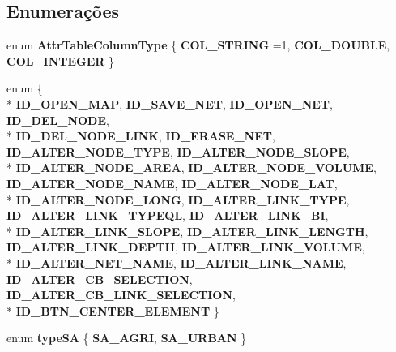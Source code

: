\subsection*{Enumerações}
\begin{DoxyCompactItemize}
\item 
enum {\bf Attr\+Table\+Column\+Type} \{ {\bf C\+O\+L\+\_\+\+S\+T\+R\+I\+NG} =1, 
{\bf C\+O\+L\+\_\+\+D\+O\+U\+B\+LE}, 
{\bf C\+O\+L\+\_\+\+I\+N\+T\+E\+G\+ER}
 \}
\item 
enum \{ \\*
{\bf I\+D\+\_\+\+O\+P\+E\+N\+\_\+\+M\+AP}, 
{\bf I\+D\+\_\+\+S\+A\+V\+E\+\_\+\+N\+ET}, 
{\bf I\+D\+\_\+\+O\+P\+E\+N\+\_\+\+N\+ET}, 
{\bf I\+D\+\_\+\+D\+E\+L\+\_\+\+N\+O\+DE}, 
\\*
{\bf I\+D\+\_\+\+D\+E\+L\+\_\+\+N\+O\+D\+E\+\_\+\+L\+I\+NK}, 
{\bf I\+D\+\_\+\+E\+R\+A\+S\+E\+\_\+\+N\+ET}, 
{\bf I\+D\+\_\+\+A\+L\+T\+E\+R\+\_\+\+N\+O\+D\+E\+\_\+\+T\+Y\+PE}, 
{\bf I\+D\+\_\+\+A\+L\+T\+E\+R\+\_\+\+N\+O\+D\+E\+\_\+\+S\+L\+O\+PE}, 
\\*
{\bf I\+D\+\_\+\+A\+L\+T\+E\+R\+\_\+\+N\+O\+D\+E\+\_\+\+A\+R\+EA}, 
{\bf I\+D\+\_\+\+A\+L\+T\+E\+R\+\_\+\+N\+O\+D\+E\+\_\+\+V\+O\+L\+U\+ME}, 
{\bf I\+D\+\_\+\+A\+L\+T\+E\+R\+\_\+\+N\+O\+D\+E\+\_\+\+N\+A\+ME}, 
{\bf I\+D\+\_\+\+A\+L\+T\+E\+R\+\_\+\+N\+O\+D\+E\+\_\+\+L\+AT}, 
\\*
{\bf I\+D\+\_\+\+A\+L\+T\+E\+R\+\_\+\+N\+O\+D\+E\+\_\+\+L\+O\+NG}, 
{\bf I\+D\+\_\+\+A\+L\+T\+E\+R\+\_\+\+L\+I\+N\+K\+\_\+\+T\+Y\+PE}, 
{\bf I\+D\+\_\+\+A\+L\+T\+E\+R\+\_\+\+L\+I\+N\+K\+\_\+\+T\+Y\+P\+E\+QL}, 
{\bf I\+D\+\_\+\+A\+L\+T\+E\+R\+\_\+\+L\+I\+N\+K\+\_\+\+BI}, 
\\*
{\bf I\+D\+\_\+\+A\+L\+T\+E\+R\+\_\+\+L\+I\+N\+K\+\_\+\+S\+L\+O\+PE}, 
{\bf I\+D\+\_\+\+A\+L\+T\+E\+R\+\_\+\+L\+I\+N\+K\+\_\+\+L\+E\+N\+G\+TH}, 
{\bf I\+D\+\_\+\+A\+L\+T\+E\+R\+\_\+\+L\+I\+N\+K\+\_\+\+D\+E\+P\+TH}, 
{\bf I\+D\+\_\+\+A\+L\+T\+E\+R\+\_\+\+L\+I\+N\+K\+\_\+\+V\+O\+L\+U\+ME}, 
\\*
{\bf I\+D\+\_\+\+A\+L\+T\+E\+R\+\_\+\+N\+E\+T\+\_\+\+N\+A\+ME}, 
{\bf I\+D\+\_\+\+A\+L\+T\+E\+R\+\_\+\+L\+I\+N\+K\+\_\+\+N\+A\+ME}, 
{\bf I\+D\+\_\+\+A\+L\+T\+E\+R\+\_\+\+C\+B\+\_\+\+S\+E\+L\+E\+C\+T\+I\+ON}, 
{\bf I\+D\+\_\+\+A\+L\+T\+E\+R\+\_\+\+C\+B\+\_\+\+L\+I\+N\+K\+\_\+\+S\+E\+L\+E\+C\+T\+I\+ON}, 
\\*
{\bf I\+D\+\_\+\+B\+T\+N\+\_\+\+C\+E\+N\+T\+E\+R\+\_\+\+E\+L\+E\+M\+E\+NT}
 \}
\item 
enum {\bf type\+SA} \{ {\bf S\+A\+\_\+\+A\+G\+RI}, 
{\bf S\+A\+\_\+\+U\+R\+B\+AN}
 \}
\end{DoxyCompactItemize}
